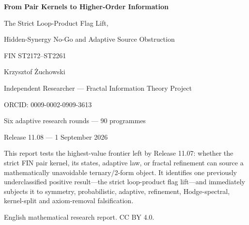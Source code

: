 \documentclass[11pt,a4paper]{article}
\begin{document}
\begin{titlepage}\centering\vspace*{13mm}
{\Huge\bfseries From Pair Kernels to Higher-Order Information\par}\vspace{4mm}
{\LARGE The Strict Loop-Product Flag Lift,\par}\vspace{2mm}
{\LARGE Hidden-Synergy No-Go and Adaptive Source Obstruction\par}\vspace{11mm}
{\Large FIN ST2172--ST2261\par}\vspace{8mm}
{\Large Krzysztof \.Zuchowski\par}
{\normalsize Independent Researcher --- Fractal Information Theory Project\par}
{\normalsize ORCID: 0009-0002-0909-3613\par}\vspace{8mm}
{\large Six adaptive research rounds --- 90 programmes\par}
{\large Release 11.08 --- 1 September 2026\par}
\vfill
\begin{minipage}{.88\textwidth}\small
This report tests the highest-value frontier left by Release 11.07: whether the
strict FIN pair kernel, its states, adaptive law, or fractal refinement can
source a mathematically unavoidable ternary/2-form object.  It identifies one
previously underclassified positive result---the strict loop-product flag
lift---and immediately subjects it to symmetry, probabilistic, adaptive,
refinement, Hodge-spectral, kernel-split and axiom-removal falsification.
\end{minipage}\vfill
{\small English mathematical research report. CC BY 4.0.}
\end{titlepage}
\end{document}
